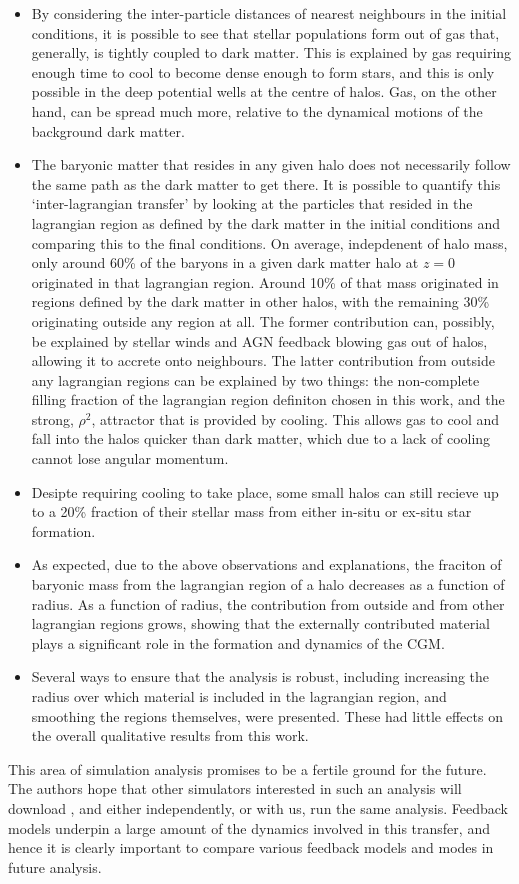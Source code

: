 \begin{itemize}
    \item By considering the inter-particle distances of nearest neighbours
    in the initial conditions, it is possible to see that stellar populations
    form out of gas that, generally, is tightly coupled to dark matter. This
    is explained by gas requiring enough time to cool to become dense enough
    to form stars, and this is only possible in the deep potential wells at
    the centre of halos. Gas, on the other hand, can be spread much more,
    relative to the dynamical motions of the background dark matter.
    \item The baryonic matter that resides in any given halo does not necessarily
    follow the same path as the dark matter to get there. It is possible to
    quantify this `inter-lagrangian transfer' by looking at the particles
    that resided in the lagrangian region as defined by the dark matter in the
    initial conditions and comparing this to the final conditions. On average,
    indepdenent of halo mass, only around 60\% of the baryons in a given
    dark matter halo at $z=0$ originated in that lagrangian region.
    Around 10\% of that mass originated in regions defined by the dark matter
    in other halos, with the remaining 30\% originating outside any region
    at all. The former contribution can, possibly, be explained by stellar
    winds and AGN feedback blowing gas out of halos, allowing it to accrete
    onto neighbours. The latter contribution from outside any lagrangian regions
    can be explained by two things: the non-complete filling fraction of the
    lagrangian region definiton chosen in this work, and the strong, $\rho^2$,
    attractor that is provided by cooling. This allows gas to cool and fall
    into the halos quicker than dark matter, which due to a lack of cooling
    cannot lose angular momentum.
    \item Desipte requiring cooling to take place, some small halos can still
    recieve up to a 20\% fraction of their stellar mass from either in-situ
    or ex-situ star formation.
    \item As expected, due to the above observations and explanations, the
    fraciton of baryonic mass from the lagrangian region of a halo decreases
    as a function of radius. As a function of radius, the contribution from
    outside and from other lagrangian regions grows, showing that the
    externally contributed material plays a significant role in the formation
    and dynamics of the CGM.
    \item Several ways to ensure that the analysis is robust, including
    increasing the radius over which material is included in the lagrangian
    region, and smoothing the regions themselves, were presented. These had
    little effects on the overall qualitative results from this work.
\end{itemize}
This area of simulation analysis promises to be a fertile ground for the
future. The authors hope that other simulators interested in such an analysis
will download \ltcaesar{}, and either independently, or with us, run the
same analysis. Feedback models underpin a large amount of the dynamics
involved in this transfer, and hence it is clearly important to compare
various feedback models and modes in future analysis.
